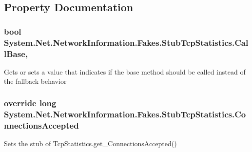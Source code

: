\subsection{Property Documentation}
\hypertarget{class_system_1_1_net_1_1_network_information_1_1_fakes_1_1_stub_tcp_statistics_ae37f8bd6439db070fe1a4ed86393252d}{
\subsubsection[{Call\-Base}]{\setlength{\rightskip}{0pt plus 5cm}bool System.\-Net.\-Network\-Information.\-Fakes.\-Stub\-Tcp\-Statistics.\-Call\-Base\hspace{0.3cm}{\ttfamily [get]}, {\ttfamily [set]}}}\label{class_system_1_1_net_1_1_network_information_1_1_fakes_1_1_stub_tcp_statistics_ae37f8bd6439db070fe1a4ed86393252d}


Gets or sets a value that indicates if the base method should be called instead of the fallback behavior

\hypertarget{class_system_1_1_net_1_1_network_information_1_1_fakes_1_1_stub_tcp_statistics_a70c50a9fe338035615896d699e6803cc}{
\subsubsection[{Connections\-Accepted}]{\setlength{\rightskip}{0pt plus 5cm}override long System.\-Net.\-Network\-Information.\-Fakes.\-Stub\-Tcp\-Statistics.\-Connections\-Accepted\hspace{0.3cm}{\ttfamily [get]}}}\label{class_system_1_1_net_1_1_network_information_1_1_fakes_1_1_stub_tcp_statistics_a70c50a9fe338035615896d699e6803cc}


Sets the stub of Tcp\-Statistics.\-get\-\_\-\-Connections\-Accepted()

